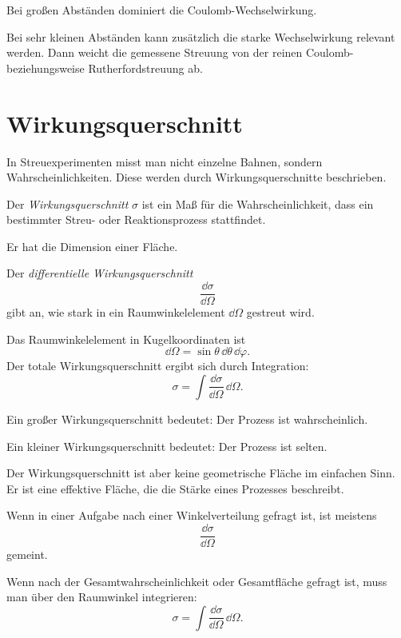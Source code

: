 \begin{conceptbox}
Bei großen Abständen dominiert die Coulomb-Wechselwirkung.

Bei sehr kleinen Abständen kann zusätzlich die starke Wechselwirkung relevant werden.
Dann weicht die gemessene Streuung von der reinen Coulomb- beziehungsweise
Rutherfordstreuung ab.
\end{conceptbox}

\section{Wirkungsquerschnitt}

In Streuexperimenten misst man nicht einzelne Bahnen, sondern Wahrscheinlichkeiten.
Diese werden durch Wirkungsquerschnitte beschrieben.

\begin{definitionbox}
Der \emph{Wirkungsquerschnitt} $\sigma$ ist ein Maß für die Wahrscheinlichkeit,
dass ein bestimmter Streu- oder Reaktionsprozess stattfindet.

Er hat die Dimension einer Fläche.
\end{definitionbox}

\begin{definitionbox}
Der \emph{differentielle Wirkungsquerschnitt}
\[
    \frac{\dd\sigma}{\dd\Omega}
\]
gibt an, wie stark in ein Raumwinkelelement $\dd\Omega$ gestreut wird.
\end{definitionbox}

\begin{formulabox}
Das Raumwinkelelement in Kugelkoordinaten ist
\[
    \dd\Omega = \sin\theta\,\dd\theta\,\dd\varphi.
\]
Der totale Wirkungsquerschnitt ergibt sich durch Integration:
\[
    \sigma
    =
    \int \frac{\dd\sigma}{\dd\Omega}\,\dd\Omega.
\]
\end{formulabox}

\begin{conceptbox}
Ein großer Wirkungsquerschnitt bedeutet:
Der Prozess ist wahrscheinlich.

Ein kleiner Wirkungsquerschnitt bedeutet:
Der Prozess ist selten.

Der Wirkungsquerschnitt ist aber keine geometrische Fläche im einfachen Sinn.
Er ist eine effektive Fläche, die die Stärke eines Prozesses beschreibt.
\end{conceptbox}

\begin{examtipbox}
Wenn in einer Aufgabe nach einer Winkelverteilung gefragt ist, ist meistens
\[
    \frac{\dd\sigma}{\dd\Omega}
\]
gemeint.

Wenn nach der Gesamtwahrscheinlichkeit oder Gesamtfläche gefragt ist, muss man über
den Raumwinkel integrieren:
\[
    \sigma
    =
    \int \frac{\dd\sigma}{\dd\Omega}\,\dd\Omega.
\]
\end{examtipbox}

